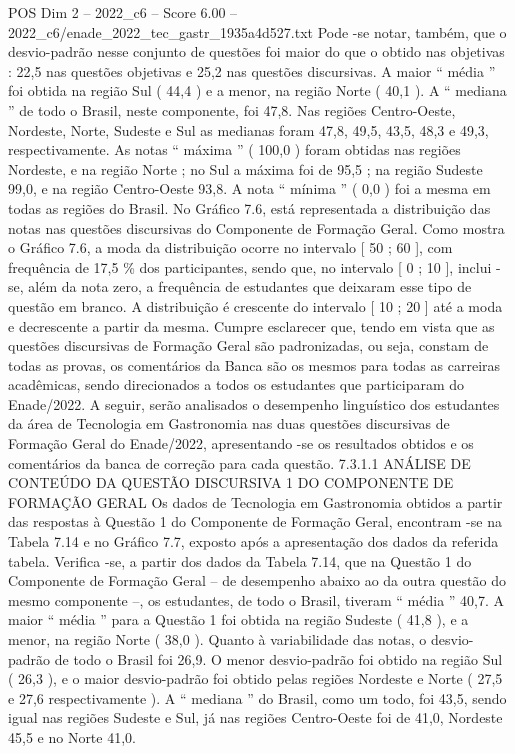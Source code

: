 \begin{textsample}{POS Dim 2 – 2022\_c6 – Score 6.00 – 2022\_c6/enade\_2022\_tec\_gastr\_1935a4d527.txt}
Pode -se notar, também, que o desvio-padrão nesse conjunto de questões foi maior do que o obtido nas objetivas : 22,5 nas questões objetivas e 25,2 nas questões discursivas.
A maior “ média ” foi obtida na região Sul ( 44,4 ) e a menor, na região Norte ( 40,1 ).
A “ mediana ” de todo o Brasil, neste componente, foi 47,8.
Nas regiões Centro-Oeste, Nordeste, Norte, Sudeste e Sul as medianas foram 47,8, 49,5, 43,5, 48,3 e 49,3, respectivamente.
As notas “ máxima ” ( 100,0 ) foram obtidas nas regiões Nordeste, e na região Norte ; no Sul a máxima foi de 95,5 ; na região Sudeste 99,0, e na região Centro-Oeste 93,8.
A nota “ mínima ” ( 0,0 ) foi a mesma em todas as regiões do Brasil.
No Gráfico 7.6, está representada a distribuição das notas nas questões discursivas do Componente de Formação Geral.
Como mostra o Gráfico 7.6, a moda da distribuição ocorre no intervalo [ 50 ; 60 ], com frequência de 17,5 \% dos participantes, sendo que, no intervalo [ 0 ; 10 ], inclui -se, além da nota zero, a frequência de estudantes que deixaram esse tipo de questão em branco.
A distribuição é crescente do intervalo [ 10 ; 20 ] até a moda e decrescente a partir da mesma.
Cumpre esclarecer que, tendo em vista que as questões discursivas de Formação Geral são padronizadas, ou seja, constam de todas as provas, os comentários da Banca são os mesmos para todas as carreiras acadêmicas, sendo direcionados a todos os estudantes que participaram do Enade/2022.
A seguir, serão analisados o desempenho linguístico dos estudantes da área de Tecnologia em Gastronomia nas duas questões discursivas de Formação Geral do Enade/2022, apresentando -se os resultados obtidos e os comentários da banca de correção para cada questão. 7.3.1.1 ANÁLISE DE CONTEÚDO DA QUESTÃO DISCURSIVA 1 DO COMPONENTE DE FORMAÇÃO GERAL Os dados de Tecnologia em Gastronomia obtidos a partir das respostas à Questão 1 do Componente de Formação Geral, encontram -se na Tabela 7.14 e no Gráfico 7.7, exposto após a apresentação dos dados da referida tabela.
Verifica -se, a partir dos dados da Tabela 7.14, que na Questão 1 do Componente de Formação Geral – de desempenho abaixo ao da outra questão do mesmo componente –, os estudantes, de todo o Brasil, tiveram “ média ” 40,7.
A maior “ média ” para a Questão 1 foi obtida na região Sudeste ( 41,8 ), e a menor, na região Norte ( 38,0 ).
Quanto à variabilidade das notas, o desvio-padrão de todo o Brasil foi 26,9.
O menor desvio-padrão foi obtido na região Sul ( 26,3 ), e o maior desvio-padrão foi obtido pelas regiões Nordeste e Norte ( 27,5 e 27,6 respectivamente ).
A “ mediana ” do Brasil, como um todo, foi 43,5, sendo igual nas regiões Sudeste e Sul, já nas regiões Centro-Oeste foi de 41,0, Nordeste 45,5 e no Norte 41,0.

\end{textsample}
